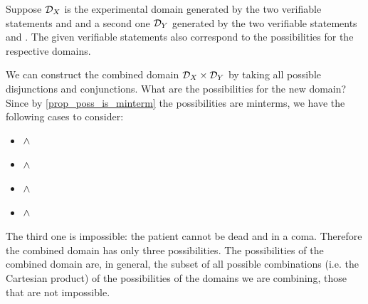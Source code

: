\documentclass[11pt,letterpaper,fleqn]{memoir} %
\begin{document}
Suppose $\mathcal{D}_X$ is the experimental domain generated by the two verifiable statements  and  and a second one $\mathcal{D}_Y$ generated by the two verifiable statements  and . The given verifiable statements also correspond to the possibilities for the respective domains.

We can construct the combined domain $\mathcal{D}_X \times \mathcal{D}_Y$ by taking all possible disjunctions and conjunctions. What are the possibilities for the new domain? Since by \ref{prop_poss_is_minterm} the possibilities are minterms, we have the following cases to consider:
\begin{itemize}
	\item {} $\wedge$ 
	\item {} $\wedge$ 
	\item {} $\wedge$ 
	\item {} $\wedge$ 
\end{itemize}
The third one is impossible: the patient cannot be dead and in a coma. Therefore the combined domain has only three possibilities. The possibilities of the combined domain are, in general, the subset of all possible combinations (i.e. the Cartesian product) of the possibilities of the domains we are combining, those that are not impossible.
\end{document}

